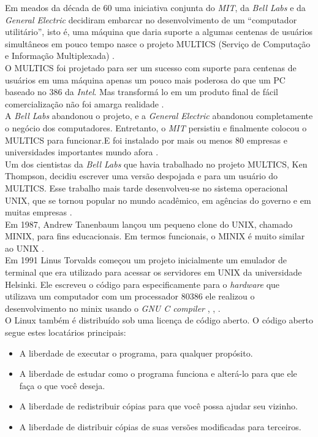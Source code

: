 Em meados da década de 60 uma iniciativa conjunta do \emph{MIT}, da \emph{Bell Labs}  e da \emph{General Electric} decidiram embarcar no desenvolvimento de um “computador utilitário”, isto é, uma máquina que daria suporte a algumas centenas de usuários simultâneos em pouco tempo nasce o projeto MULTICS (Serviço de Computação e Informação Multiplexada) \cite{Tanenbaum2016}.\\
O MULTICS foi projetado para ser um sucesso com suporte para centenas de usuários em uma máquina apenas um pouco mais poderosa do que um PC baseado no 386 da \emph{Intel}. Mas transformá lo em um produto final de fácil comercialização não foi amarga realidade \cite{Tanenbaum2016}.\\
A \emph{Bell Labs} abandonou o projeto, e a \emph{General Electric} abandonou completamente o negócio dos computadores. Entretanto, o \emph{MIT} persistiu e finalmente colocou o MULTICS para funcionar.E foi instalado por mais ou menos 80 empresas e universidades importantes mundo afora \cite{Tanenbaum2016}.\\
Um dos cientistas da \emph{Bell Labs} que havia trabalhado no projeto MULTICS, Ken Thompson, decidiu escrever uma versão despojada e para um usuário do MULTICS. Esse trabalho mais tarde desenvolveu-se no sistema operacional UNIX, que se tornou popular no mundo acadêmico, em agências do governo e em muitas empresas \cite{Tanenbaum2016}.\\
Em 1987, Andrew Tanenbaum lançou um pequeno clone do UNIX, chamado MINIX, para fins educacionais. Em termos funcionais, o MINIX é muito similar ao UNIX \cite{Tanenbaum2016}.\\
Em 1991 Linus Torvalds começou um projeto inicialmente um emulador de terminal que era utilizado para acessar os servidores em UNIX da universidade Helsinki. Ele escreveu o código para especificamente  para o \emph{hardware} que utilizava um computador com um processador 80386 ele realizou o desenvolvimento no minix usando o \emph{GNU C compiler} \cite{Torvalds1991}, \cite{Torvalds1993}, \cite{torvalds2002}.\\
O Linux também é distribuído sob uma licença de código aberto. O código aberto segue estes locatários principais:
\begin{itemize}
    \item A liberdade de executar o programa, para qualquer propósito.
    \item A liberdade de estudar como o programa funciona e alterá-lo para que ele faça o que você deseja.
    \item A liberdade de redistribuir cópias para que você possa ajudar seu vizinho.
    \item A liberdade de distribuir cópias de suas versões modificadas para terceiros.
\end{itemize}
